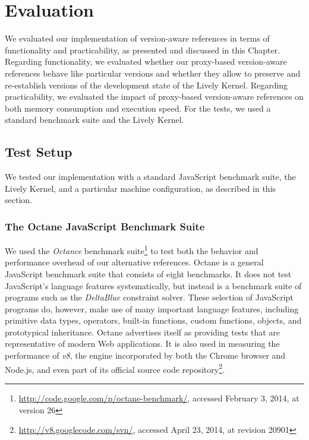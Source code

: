 \chapter{Evaluation} \label{chapter:EVALUATION}

We evaluated our implementation of version-aware references in terms of functionality and practicability, as presented and discussed in this Chapter.
Regarding functionality, we evaluated whether our proxy-based version-aware references behave like particular versions and whether they allow to preserve and re-establish versions of the development state of the Lively Kernel.
Regarding practicability, we evaluated the impact of proxy-based version-aware references on both memory consumption and execution speed.
For the tests, we used a standard benchmark suite and the Lively Kernel.


\section{Test Setup}

We tested our implementation with a standard JavaScript benchmark suite, the Lively Kernel, and a particular machine configuration, as described in this section.

\subsection{The Octane JavaScript Benchmark Suite}

We used the \emph{Octance} benchmark suite\footnote{\url{http://code.google.com/p/octane-benchmark/}, accessed February 3, 2014, at version 26} to test both the behavior and performance overhead of our alternative references.
Octane is a general JavaScript benchmark suite that consists of eight benchmarks.
It does not test JavaScript's language features systematically, but instead is a benchmark suite of programs such as the \emph{DeltaBlue}\cite{FreemanBenson1990ICS} constraint solver.
These selection of JavaScript programs do, however, make use of many important language features, including primitive data types, operators, built-in functions, custom functions, objects, and prototypical inheritance.
Octane advertises itself as providing tests that are representative of modern Web applications.
It is also used in measuring the performance of \emph{v8}, the engine incorporated by both the Chrome browser and Node.js, and even part of its official source code repository\footnote{\url{http://v8.googlecode.com/svn/}, accessed April 23, 2014, at revision 20901}.

